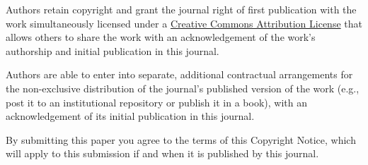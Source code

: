 Authors retain copyright and grant the journal right of first publication with
the work simultaneously licensed under a
\href{http://creativecommons.org/licenses/by/3.0/}{Creative Commons Attribution
License} that allows others to share the work with an acknowledgement of the
work's authorship and initial publication in this journal.

Authors are able to enter into separate, additional contractual arrangements
for the non-exclusive distribution of the journal's published version of the
work (e.g., post it to an institutional repository or publish it in a book),
with an acknowledgement of its initial publication in this journal.

By submitting this paper you agree to the terms of this Copyright Notice, which
will apply to this submission if and when it is published by this journal.

